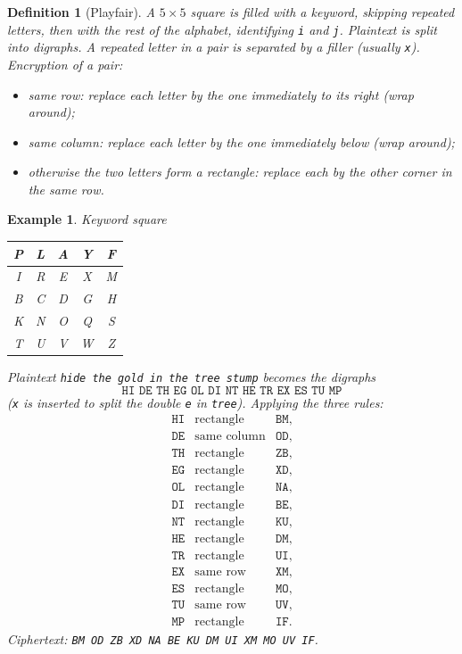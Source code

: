 \documentclass[11pt]{article}
\newtheorem{definition}[theorem]{Definition}
\newtheorem{example}[theorem]{Example}
\theoremstyle{remark}
\begin{document}
\begin{definition}[Playfair]
A $5\times 5$ square is filled with a keyword, skipping repeated letters,
then with the rest of the alphabet, identifying \texttt{i} and \texttt{j}.
Plaintext is split into digraphs. A repeated letter in a pair is
separated by a filler (usually \texttt{x}). Encryption of a pair:
\begin{itemize}[leftmargin=1.4em]
    \item same \emph{row}: replace each letter by the one immediately to
    its right (wrap around);
    \item same \emph{column}: replace each letter by the one immediately
    below (wrap around);
    \item otherwise the two letters form a rectangle: replace each by the
    other corner in the same row.
\end{itemize}
\end{definition}

\begin{example}
Keyword square
\begin{center}
\renewcommand{\arraystretch}{1.2}
\begin{tabular}{|c|c|c|c|c|}
\hline
P & L & A & Y & F \\
\hline
I & R & E & X & M \\
\hline
B & C & D & G & H \\
\hline
K & N & O & Q & S \\
\hline
T & U & V & W & Z \\
\hline
\end{tabular}
\end{center}
Plaintext \texttt{hide the gold in the tree stump} becomes the digraphs
\[
    \texttt{HI DE TH EG OL DI NT HE TR EX ES TU MP}
\]
(\texttt{x} is inserted to split the double \texttt{e} in
\texttt{tree}). Applying the three rules:
\[
\begin{array}{lll}
\texttt{HI}&\text{rectangle}&\texttt{BM},\\
\texttt{DE}&\text{same column}&\texttt{OD},\\
\texttt{TH}&\text{rectangle}&\texttt{ZB},\\
\texttt{EG}&\text{rectangle}&\texttt{XD},\\
\texttt{OL}&\text{rectangle}&\texttt{NA},\\
\texttt{DI}&\text{rectangle}&\texttt{BE},\\
\texttt{NT}&\text{rectangle}&\texttt{KU},\\
\texttt{HE}&\text{rectangle}&\texttt{DM},\\
\texttt{TR}&\text{rectangle}&\texttt{UI},\\
\texttt{EX}&\text{same row}&\texttt{XM},\\
\texttt{ES}&\text{rectangle}&\texttt{MO},\\
\texttt{TU}&\text{same row}&\texttt{UV},\\
\texttt{MP}&\text{rectangle}&\texttt{IF}.
\end{array}
\]
Ciphertext: \texttt{BM OD ZB XD NA BE KU DM UI XM MO UV IF}.
\end{example}
\end{document}
